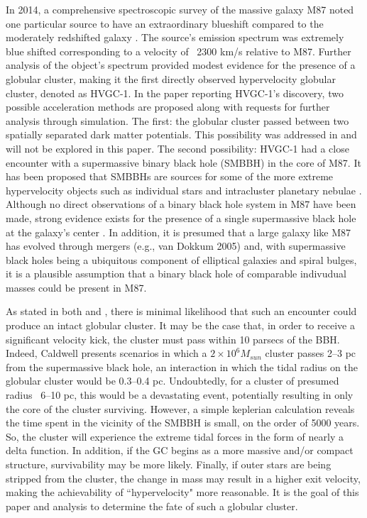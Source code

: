 \documentclass{aastex62}
\begin{document}
In 2014, a comprehensive spectroscopic survey of the massive galaxy M87 noted one particular source to have an extraordinary blueshift compared to the moderately redshifted galaxy \citep{cald14}. The source's emission spectrum was extremely blue shifted corresponding to a velocity of ~2300 km/s relative to M87. Further analysis of the object's spectrum provided modest evidence for the presence of a globular cluster, making it the first directly observed hypervelocity globular cluster, denoted as HVGC-1. In the paper reporting HVGC-1's discovery, two possible acceleration methods are proposed along with requests for further analysis through simulation. The first: the globular cluster passed between two spatially separated dark matter potentials. This possibility was addressed in \citet{sam15} and will not be explored in this paper. The second possibility: HVGC-1 had a close encounter with a supermassive binary black hole (SMBBH) in the core of M87. It has been proposed that SMBBHs are sources for some of the more extreme hypervelocity objects such as individual stars \citep{yutre03} and intracluster planetary nebulae \citep{hol05}. Although no direct observations of a binary black hole system in M87 have been made, strong evidence exists for the presence of a single supermassive black hole at the galaxy's center \citep{geb11}. In addition, it is presumed that a large galaxy like M87 has evolved through mergers (e.g., van Dokkum 2005) and, with supermassive black holes being a ubiquitous component of elliptical galaxies and spiral bulges, it is a plausible assumption that a binary black hole of comparable indivudual masses could be present in M87. 

As stated in both \citet{cald14} and \citet{sam15}, there is minimal likelihood that such an encounter could produce an intact globular cluster. It may be the case that, in order to receive a significant velocity kick, the cluster must pass within 10 parsecs of the BBH. Indeed, Caldwell presents scenarios in which a $2\times10^6M_{sun}$ cluster passes 2--3 pc from the supermassive black hole, an interaction in which the tidal radius on the globular cluster would be 0.3--0.4 pc. Undoubtedly, for a cluster of presumed radius ~6--10 pc, this would be a devastating event, potentially resulting in only the core of the cluster surviving. However, a simple keplerian calculation reveals the time spent in the vicinity of the SMBBH is small, on the order of 5000 years. So, the cluster will experience the extreme tidal forces in the form of nearly a delta function. In addition, if the GC begins as a more massive and/or compact structure, survivability may be more likely. Finally, if outer stars are being stripped from the cluster, the change in mass may result in a higher exit velocity, making the achievability of ``hypervelocity" more reasonable. It is the goal of this paper and analysis to determine the fate of such a globular cluster. 
\end{document}
